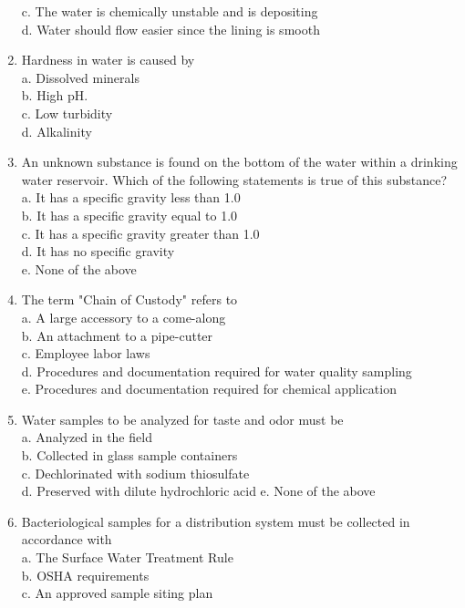 \begin{enumerate}[1.]
c. The water is chemically unstable and is depositing\\
d. Water should flow easier since the lining is smooth\\
\item Hardness in water is caused by\\
a. Dissolved minerals\\
b. High $\mathrm{pH}$.\\
c. Low turbidity\\
d. Alkalinity\\
\item An unknown substance is found on the bottom of the water within a drinking water reservoir. Which of the following statements is true of this substance?\\
a. It has a specific gravity less than 1.0\\
b. It has a specific gravity equal to 1.0\\
c. It has a specific gravity greater than 1.0\\
d. It has no specific gravity\\
e. None of the above\\
\item The term "Chain of Custody" refers to\\
a. A large accessory to a come-along\\
b. An attachment to a pipe-cutter\\
c. Employee labor laws\\
d. Procedures and documentation required for water quality sampling\\
e. Procedures and documentation required for chemical application\\
\item Water samples to be analyzed for taste and odor must be\\
a. Analyzed in the field\\
b. Collected in glass sample containers\\
c. Dechlorinated with sodium thiosulfate\\
d. Preserved with dilute hydrochloric acid e. None of the above\\
\item Bacteriological samples for a distribution system must be collected in accordance with\\
a. The Surface Water Treatment Rule\\
b. OSHA requirements\\
c. An approved sample siting plan\\

\end{enumerate}
